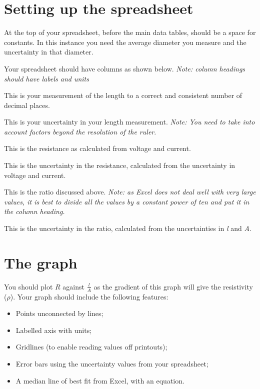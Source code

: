 \documentclass[11pt]{article}
\begin{document}
\begin{adjustwidth}{0cm}{0.4\textwidth}
\section{Setting up the spreadsheet}
At the top of your spreadsheet, before the main data tables, should be a space for constants.  In this instance you need the average diameter you measure and the uncertainty in that diameter.

Your spreadsheet should have columns as shown below.
\emph{Note: column headings should have labels and units}
\begin{description}
    \setlength{\itemsep}{10pt}
    \item[Length] This is your measurement of the length to a correct and consistent number of decimal places.
    \item[Uncertainty in length] This is your uncertainty in your length measurement.  \emph{Note: You need to take into account factors beyond the resolution of the ruler}.
    \item[Voltage] 
    \item[Uncertainty in Voltage] 
    \item[Current] 
    \item[Uncertainty in current] 
    \item[Resistance] This is the resistance as calculated from voltage and current.
    \item[Uncertainty in resistance] This is the uncertainty in the resistance, calculated from the uncertainty in voltage and current.
    \item[\emph{l}/\emph{A}] This is the ratio discussed above.  \emph{Note: as Excel does not deal well with very large values, it is best to divide all the values by a constant power of ten and put it in the column heading.}
    \item[Uncertainty in \emph{l}/\emph{A}] This is the uncertainty in the ratio, calculated from the uncertainties in \emph{l} and \emph{A}.
\end{description}
\newpage

\section{The graph}

You should plot $R$ against $\frac{l}{A}$ as the gradient of this graph will give the resistivity ($\rho$).  Your graph should include the following features:
\begin{itemize}
    \item Points unconnected by lines;
    \item Labelled axis with units;
    \item Gridlines (to enable reading values off printouts);
    \item Error bars using the uncertainty values from your spreadsheet;
    \item A median line of best fit from Excel, with an equation.
\end{itemize}


\end{adjustwidth}
\end{document}
